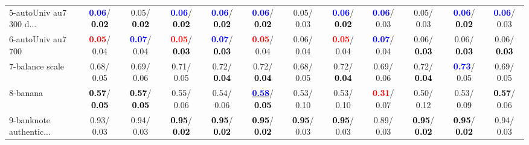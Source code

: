 \begin{table}[h]
\begin{center}
{\begin{tabular}{lc|c|c|c|c|c|c|c|c|c|c}
5-autoUniv au7 300 d... & \textcolor{blue}{\textbf{  0.06}}/\textcolor{black}{\textbf{  0.02}} &   0.05/\textcolor{black}{\textbf{  0.02}} & \textcolor{blue}{\textbf{  0.06}}/\textcolor{black}{\textbf{  0.02}} & \textcolor{blue}{\textbf{  0.06}}/\textcolor{black}{\textbf{  0.02}} & \textcolor{blue}{\textbf{  0.06}}/\textcolor{black}{\textbf{  0.02}} &   0.05/  0.03 & \textcolor{blue}{\textbf{  0.06}}/\textcolor{black}{\textbf{  0.02}} & \textcolor{blue}{\textbf{  0.06}}/  0.03 &   0.05/  0.03 & \textcolor{blue}{\textbf{  0.06}}/\textcolor{black}{\textbf{  0.02}} & \textcolor{blue}{\textbf{  0.06}}/  0.03 \\
6-autoUniv au7 700 & \textcolor{red}{\textbf{  0.05}}/  0.04 & \textcolor{blue}{\textbf{  0.07}}/  0.04 & \textcolor{red}{\textbf{  0.05}}/\textcolor{black}{\textbf{  0.03}} & \textcolor{blue}{\textbf{  0.07}}/\textcolor{black}{\textbf{  0.03}} & \textcolor{red}{\textbf{  0.05}}/  0.04 &   0.06/  0.04 & \textcolor{red}{\textbf{  0.05}}/  0.04 & \textcolor{blue}{\textbf{  0.07}}/  0.04 &   0.06/\textcolor{black}{\textbf{  0.03}} &   0.06/\textcolor{black}{\textbf{  0.03}} &   0.06/\textcolor{black}{\textbf{  0.03}} \\
7-balance scale &   0.68/  0.05 &   0.69/  0.06 &   0.71/  0.05 &   0.72/\textcolor{black}{\textbf{  0.04}} &   0.72/\textcolor{black}{\textbf{  0.04}} &   0.68/  0.05 &   0.72/\textcolor{black}{\textbf{  0.04}} &   0.69/  0.06 &   0.72/\textcolor{black}{\textbf{  0.04}} & \textcolor{blue}{\textbf{  0.73}}/  0.05 &   0.69/  0.05 \\ \hline
8-banana & \textcolor{black}{\textbf{  0.57}}/\textcolor{black}{\textbf{  0.05}} & \textcolor{black}{\textbf{  0.57}}/\textcolor{black}{\textbf{  0.05}} &   0.55/  0.06 &   0.54/  0.06 & \underline{\textcolor{blue}{\textbf{  0.58}}}/\textcolor{black}{\textbf{  0.05}} &   0.53/  0.10 &   0.53/  0.10 & \textcolor{red}{\textbf{  0.31}}/  0.07 &   0.50/  0.12 &   0.53/  0.09 & \textcolor{black}{\textbf{  0.57}}/  0.06 \\
9-banknote authentic... &   0.93/  0.03 &   0.94/  0.03 & \textcolor{black}{\textbf{  0.95}}/\textcolor{black}{\textbf{  0.02}} & \textcolor{black}{\textbf{  0.95}}/\textcolor{black}{\textbf{  0.02}} & \textcolor{black}{\textbf{  0.95}}/\textcolor{black}{\textbf{  0.02}} & \textcolor{black}{\textbf{  0.95}}/  0.03 & \textcolor{black}{\textbf{  0.95}}/  0.03 &   0.89/  0.03 & \textcolor{black}{\textbf{  0.95}}/\textcolor{black}{\textbf{  0.02}} & \textcolor{black}{\textbf{  0.95}}/\textcolor{black}{\textbf{  0.02}} &   0.94/  0.03 \\

\end{tabular}}
\end{center}
\end{table}
